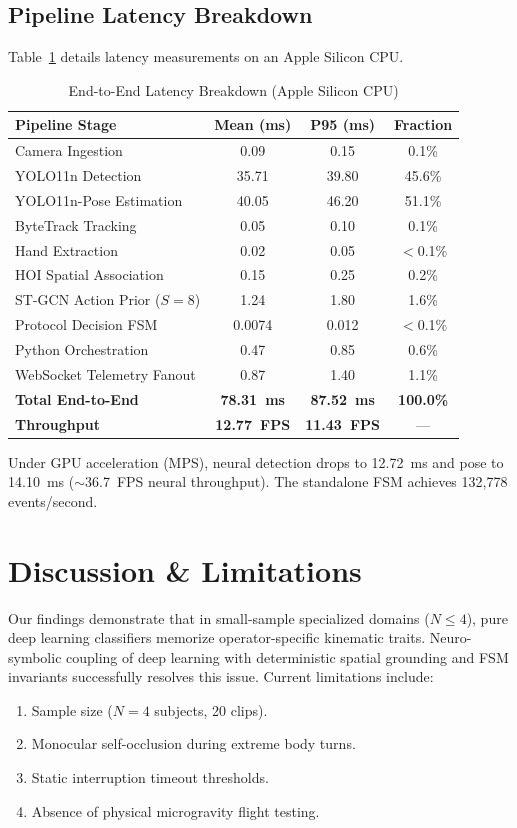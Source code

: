 \documentclass[journal,twocolumn]{IEEEtran}
\begin{document}
\subsection{Pipeline Latency Breakdown}
Table~\ref{tab:latency} details latency measurements on an Apple Silicon CPU.

\begin{table}[htbp]
\caption{End-to-End Latency Breakdown (Apple Silicon CPU)}
\label{tab:latency}
\centering
\begin{tabular}{lccc}
\toprule
\textbf{Pipeline Stage} & \textbf{Mean (ms)} & \textbf{P95 (ms)} & \textbf{Fraction} \\
\midrule
Camera Ingestion & 0.09 & 0.15 & 0.1\% \\
YOLO11n Detection & 35.71 & 39.80 & 45.6\% \\
YOLO11n-Pose Estimation & 40.05 & 46.20 & 51.1\% \\
ByteTrack Tracking & 0.05 & 0.10 & 0.1\% \\
Hand Extraction & 0.02 & 0.05 & $<$0.1\% \\
HOI Spatial Association & 0.15 & 0.25 & 0.2\% \\
ST-GCN Action Prior ($S=8$) & 1.24 & 1.80 & 1.6\% \\
Protocol Decision FSM & 0.0074 & 0.012 & $<$0.1\% \\
Python Orchestration & 0.47 & 0.85 & 0.6\% \\
WebSocket Telemetry Fanout & 0.87 & 1.40 & 1.1\% \\
\midrule
\textbf{Total End-to-End} & \textbf{78.31~ms} & \textbf{87.52~ms} & \textbf{100.0\%} \\
\textbf{Throughput} & \textbf{12.77~FPS} & \textbf{11.43~FPS} & --- \\
\bottomrule
\end{tabular}
\end{table}

Under GPU acceleration (MPS), neural detection drops to 12.72~ms and pose to 14.10~ms ($\sim$36.7~FPS neural throughput). The standalone FSM achieves 132,778 events/second.

\section{Discussion \& Limitations}
Our findings demonstrate that in small-sample specialized domains ($N \le 4$), pure deep learning classifiers memorize operator-specific kinematic traits. Neuro-symbolic coupling of deep learning with deterministic spatial grounding and FSM invariants successfully resolves this issue. Current limitations include:
\begin{enumerate}
    \item Sample size ($N=4$ subjects, 20 clips).
    \item Monocular self-occlusion during extreme body turns.
    \item Static interruption timeout thresholds.
    \item Absence of physical microgravity flight testing.
\end{enumerate}
\end{document}
